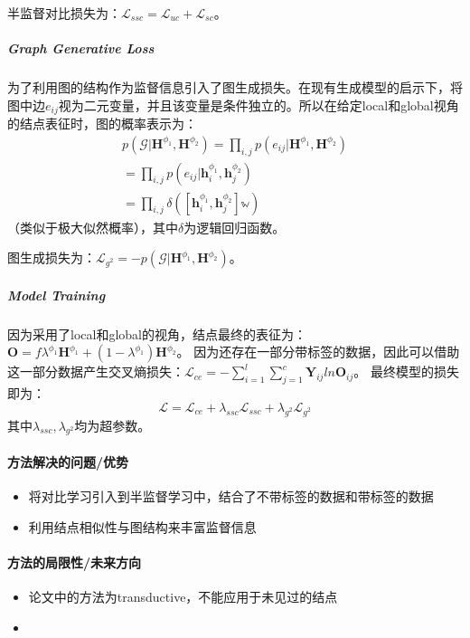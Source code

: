 半监督对比损失为：$\mathcal{L}_{ssc} = \mathcal{L}_{uc} + \mathcal{L}_{sc}$。

\subparagraph{Graph Generative Loss}
为了利用图的结构作为监督信息引入了图生成损失。在现有生成模型的启示下，将图中边$e_{ij}$视为二元变量，并且该变量是条件独立的。所以在给定local和global视角的结点表征时，图的概率表示为：
$$
\begin{aligned}
	p(\mathcal{G} | \mathbf{H}^{\phi_1}, \mathbf{H}^{\phi_2}) = \prod_{i,j} p(e_{ij}| \mathbf{H}^{\phi_1}, \mathbf{H}^{\phi_2}) \\
	= \prod_{i,j} p(e_{ij}| \mathbf{h}_i^{\phi_1}, \mathbf{h}_j^{\phi_2}) \\
	= \prod_{i,j} \delta([\mathbf{h}_i^{\phi_1}, \mathbf{h}_j^{\phi_2}] \mathbb{w})
\end{aligned}
$$
（类似于极大似然概率），其中$\delta$为逻辑回归函数。

图生成损失为：$\mathcal{L}_{g^2} = - p(\mathcal{G} | \mathbf{H}^{\phi_1}, \mathbf{H}^{\phi_2})$。

\subparagraph{Model Training}
因为采用了local和global的视角，结点最终的表征为：$\mathbf{O} =f \lambda^{\phi_1}\mathbf{H}^{\phi_1} + (1-\lambda^{\phi_1})\mathbf{H}^{\phi_2}$。
因为还存在一部分带标签的数据，因此可以借助这一部分数据产生交叉熵损失：$\mathcal{L}_{ce} = -\sum_{i=1}^l \sum_{j=1}^c \mathbf{Y}_{ij} ln\mathbf{O}_{ij}$。
最终模型的损失即为：
$$
\mathcal{L} = \mathcal{L}_{ce} + \lambda_{ssc}\mathcal{L}_{ssc} + \lambda_{g^2}\mathcal{L}_{g^2}
$$
其中$\lambda_{ssc}, \lambda_{g^2}$均为超参数。

\paragraph{方法解决的问题/优势}

\begin{itemize}

	\item 将对比学习引入到半监督学习中，结合了不带标签的数据和带标签的数据
	\item 利用结点相似性与图结构来丰富监督信息

\end{itemize}



\paragraph{方法的局限性/未来方向}

\begin{itemize}

	\item 论文中的方法为transductive，不能应用于未见过的结点
	\item {}

\end{itemize}
